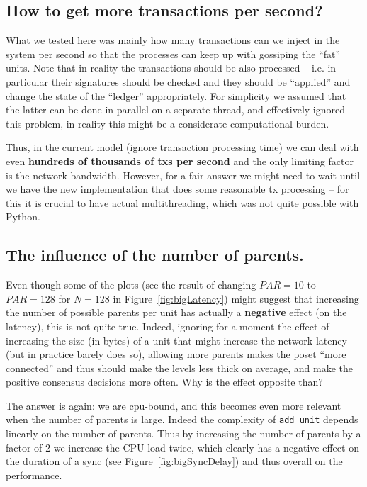 \documentclass[a4paper,10pt]{article}
\begin{document}
		\subsection{How to get more transactions per second?}
			What we tested here was mainly how many transactions can we inject in the system per second so that the processes can keep up with gossiping the ``fat'' units.
			Note that in reality the transactions should be also processed -- i.e. in particular their signatures should be checked and they should be ``applied'' and change the state of the ``ledger'' appropriately.
			For simplicity we assumed that the latter can be done in parallel on a separate thread, and effectively ignored this problem, in reality this might be a considerate computational burden.

			Thus, in the current model (ignore transaction processing time) we can deal with even {\bf hundreds of thousands of txs per second} and the only limiting factor is the network bandwidth.
			However, for a fair answer we might need to wait until we have the new implementation that does some reasonable tx processing -- for this it is crucial to have actual multithreading, which was not quite possible with Python.

		\subsection{The influence of the number of parents.}
			Even though some of the plots (see the result of changing $PAR=10$ to $PAR=128$ for $N=128$ in Figure~\ref{fig:bigLatency}) might suggest that increasing the number of possible parents per unit has actually a {\bf negative} effect (on the latency), this is not quite true.
			Indeed, ignoring for a moment the effect of increasing the size (in bytes) of a unit that might increase the network latency (but in practice barely does so), allowing more parents makes the poset ``more connected'' and thus should make the levels less thick on average, and make the positive consensus decisions more often. Why is the effect opposite than?

			The answer is again: we are cpu-bound, and this becomes even more relevant when the number of parents is large. Indeed the complexity of \lstinline{add_unit} depends linearly on the number of parents. Thus by increasing the number of parents by a factor of $2$ we increase the CPU load twice, which clearly has a negative effect on the duration of a sync (see Figure~\ref{fig:bigSyncDelay}) and thus overall on the performance.
\end{document}
